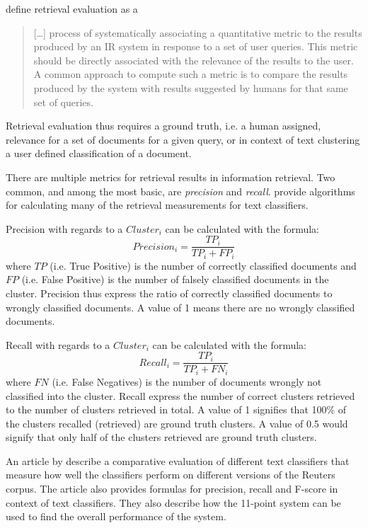 \cite[131]{Baeza-Yates2011b} define retrieval evaluation as a \begin{quote} 
[\dots] process of systematically associating a quantitative metric to the results produced by an IR system in response to a set of user queries. This metric should be directly associated with the relevance of the results to the user. A common approach to compute such a metric is to compare the results produced by the system with results suggested by humans for that same set of queries.
\end{quote}
Retrieval evaluation thus requires a ground truth, i.e. a human assigned, relevance for a set of documents for a given query, or in context of text clustering a user defined classification of a document.

There are multiple metrics for retrieval results in information retrieval. Two common, and among the most basic, are \textit{precision} and \textit{recall}. \cite{Sebastiani2002} provide algorithms for calculating many of the retrieval measurements for text classifiers.

Precision with regards to a \(Cluster_{i}\) can be calculated with the formula:
\begin{displaymath}
Precision_{i} = 
\frac{TP_{i}}{TP_{i} + FP_{i}}
\end{displaymath}
where \(TP\) (i.e. True Positive) is the number of correctly classified documents and \(FP\) (i.e. False Positive) is the number of falsely classified documents in the cluster. Precision thus express the ratio of correctly classified documents to wrongly classified documents. A value of 1 means there are no wrongly classified documents.

Recall with regards to a \(Cluster_{i}\) can be calculated with the formula: 
\begin{displaymath}
Recall_{i} = 
\frac{TP_{i}}{TP_{i} + FN_{i}}
\end{displaymath}
where \(FN\) (i.e. False Negatives) is the number of documents wrongly not classified into the cluster. Recall express the number of correct clusters retrieved to the number of clusters retrieved in total. A value of 1 signifies that 100\% of the clusters recalled (retrieved) are ground truth clusters. A value of 0.5 would signify that only half of the clusters retrieved are ground truth clusters.

An article by \cite{Yang1999} describe a comparative evaluation of different text classifiers that measure how well the classifiers perform on different versions of the Reuters corpus. The article also provides formulas for precision, recall and F-score in context of text classifiers. They also describe how the 11-point system can be used to find the overall performance of the system.


